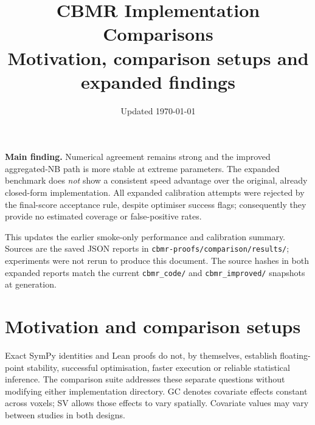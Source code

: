 \documentclass[11pt,a4paper]{article}
\title{CBMR Implementation Comparisons\\
  \large Motivation, comparison setups and expanded findings}
\author{}
\date{Updated \today}
\begin{document}
\maketitle
\vspace{-1.5em}
\noindent\textbf{Main finding.}
Numerical agreement remains strong and the improved aggregated-NB path is more
stable at extreme parameters. The expanded benchmark does \emph{not} show a
consistent speed advantage over the original, already closed-form implementation.
All \ExpandedAttempts{} expanded calibration attempts were rejected by the
final-score acceptance rule, despite optimiser success flags; consequently
they provide no estimated coverage or false-positive rates.

\medskip
\noindent This updates the earlier smoke-only performance and calibration
summary. Sources are the saved JSON reports in
\texttt{cbmr-proofs/comparison/results/}; experiments were not rerun to produce
this document. The source hashes in both expanded reports match the current
\texttt{cbmr\_code/} and \texttt{cbmr\_improved/} snapshots at generation.

\section{Motivation and comparison setups}
Exact SymPy identities and Lean proofs do not, by themselves, establish
floating-point stability, successful optimisation, faster execution or reliable
statistical inference. The comparison suite addresses these separate questions
without modifying either implementation directory.
GC denotes covariate effects constant across voxels; SV allows those effects
to vary spatially. Covariate values may vary between studies in both designs.
\end{document}
